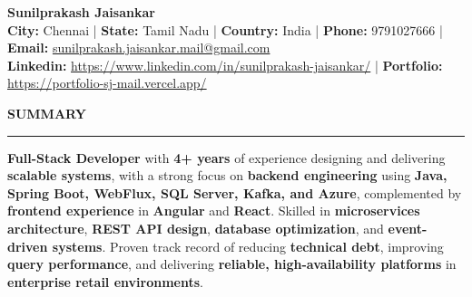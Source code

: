 \documentclass[9pt,letterpaper]{article}
\newlength{\sectionrulegap}
\newlength{\sectioncontentgap}
\newcommand{\resumesection}[1]{%
  \par\vspace{\sectionrulegap}%
  \noindent\textbf{\MakeUppercase{#1}}\par
  \nointerlineskip
  \vspace{\sectionrulegap}%
  \noindent\rule{\linewidth}{0.35pt}\par
  \nointerlineskip
  \vspace{\sectionrulegap}%
}
\newcommand{\sep}{ | }
\begin{document}
\begin{center}
{\LARGE\textbf{Sunilprakash Jaisankar}}\\[3.5pt]
{\small \textbf{City:} Chennai \sep \textbf{State:} Tamil Nadu \sep \textbf{Country:} India}\sep
{\small \textbf{Phone:} 9791027666 \sep \textbf{Email:} \href{mailto:sunilprakash.jaisankar.mail@gmail.com}{sunilprakash.jaisankar.mail@gmail.com}}\\
{\small \textbf{Linkedin: }\href{https://www.linkedin.com/in/sunilprakash-jaisankar/}{https://www.linkedin.com/in/sunilprakash-jaisankar/} \sep \textbf{Portfolio: } \href{https://portfolio-sj-mail.vercel.app/}{https://portfolio-sj-mail.vercel.app/}}
\end{center}
\vspace{-10pt}

\resumesection{Summary}
\textbf{Full-Stack Developer} with \textbf{4+ years} of experience designing and delivering \textbf{scalable systems}, with a strong focus on \textbf{backend engineering} using \textbf{Java, Spring Boot, WebFlux, SQL Server, Kafka, and Azure}, complemented by \textbf{frontend experience} in \textbf{Angular} and \textbf{React}. Skilled in \textbf{microservices architecture}, \textbf{REST API design}, \textbf{database optimization}, and \textbf{event-driven systems}. Proven track record of reducing \textbf{technical debt}, improving \textbf{query performance}, and delivering \textbf{reliable, high-availability platforms} in \textbf{enterprise retail environments}.
\vspace{\sectioncontentgap}
\end{document}
